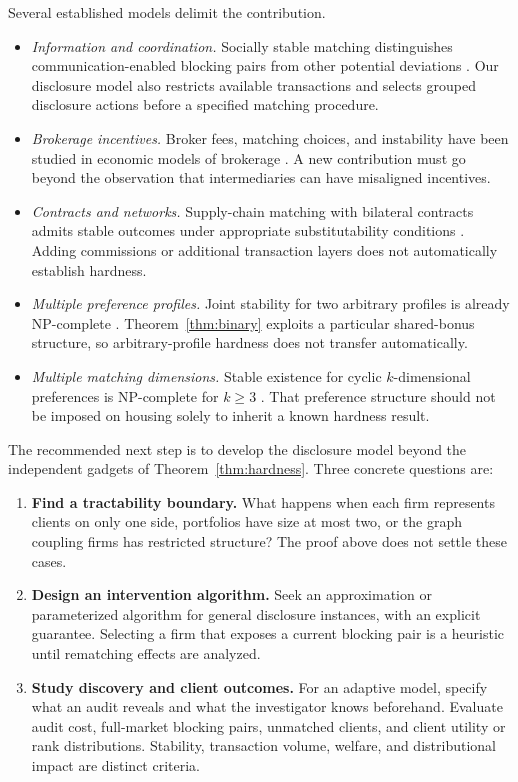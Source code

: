 \documentclass[11pt,letterpaper]{article}
\theoremstyle{definition}
\theoremstyle{remark}
\begin{document}
Several established models delimit the contribution.

\begin{itemize}
\item \emph{Information and coordination.}
Socially stable matching distinguishes communication-enabled blocking pairs
from other potential deviations \cite{askalidis2013}. Our disclosure model
also restricts available transactions and selects grouped disclosure actions
before a specified matching procedure.
\item \emph{Brokerage incentives.}
Broker fees, matching choices, and instability have been studied in economic
models of brokerage \cite{boerner2023}. A new contribution must go beyond the
observation that intermediaries can have misaligned incentives.
\item \emph{Contracts and networks.}
Supply-chain matching with bilateral contracts admits stable outcomes under
appropriate substitutability conditions \cite{hatfield2012}. Adding commissions
or additional transaction layers does not automatically establish hardness.
\item \emph{Multiple preference profiles.}
Joint stability for two arbitrary profiles is already NP-complete
\cite{miyazaki2017}. Theorem~\ref{thm:binary} exploits a particular shared-bonus
structure, so arbitrary-profile hardness does not transfer automatically.
\item \emph{Multiple matching dimensions.}
Stable existence for cyclic \(k\)-dimensional preferences is NP-complete for
\(k\geq3\) \cite{lam2019}. That preference structure should not be imposed on
housing solely to inherit a known hardness result.
\end{itemize}

The recommended next step is to develop the disclosure model beyond the
independent gadgets of Theorem~\ref{thm:hardness}. Three concrete questions are:

\begin{enumerate}
\item \textbf{Find a tractability boundary.}
What happens when each firm represents clients on only one side, portfolios
have size at most two, or the graph coupling firms has restricted structure?
The proof above does not settle these cases.
\item \textbf{Design an intervention algorithm.}
Seek an approximation or parameterized algorithm for general disclosure
instances, with an explicit guarantee. Selecting a firm that exposes a
current blocking pair is a heuristic until rematching effects are analyzed.
\item \textbf{Study discovery and client outcomes.}
For an adaptive model, specify what an audit reveals and what the investigator
knows beforehand. Evaluate audit cost, full-market blocking pairs, unmatched
clients, and client utility or rank distributions. Stability, transaction
volume, welfare, and distributional impact are distinct criteria.
\end{enumerate}
\end{document}
